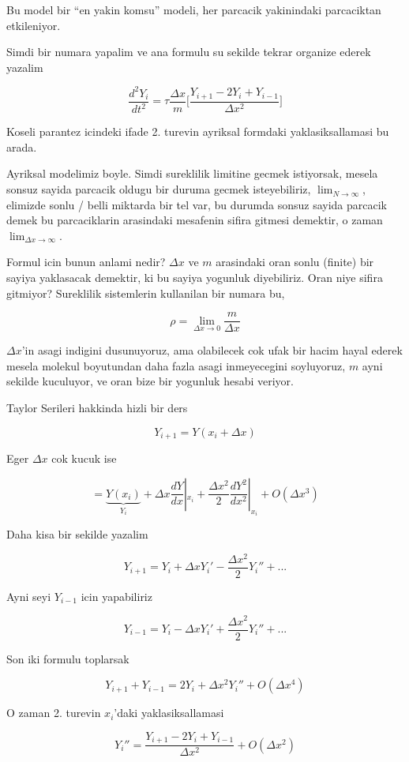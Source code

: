 \documentclass[12pt,fleqn]{article}
\begin{document}
Bu model bir ``en yakin komsu'' modeli, her parcacik yakinindaki
parcaciktan etkileniyor. 

Simdi bir numara yapalim ve ana formulu su sekilde tekrar organize ederek
yazalim

\[ \frac{d^2Y_i}{dt^2} = 
\tau \frac{\Delta x}{m} \bigg[
\frac{Y_{i+1} - 2Y_i + Y_{i-1}}{\Delta x^2}
\bigg]
\]

Koseli parantez icindeki ifade 2. turevin ayriksal formdaki
yaklasiksallamasi bu arada. 

Ayriksal modelimiz boyle. Simdi sureklilik limitine gecmek istiyorsak,
mesela sonsuz sayida parcacik oldugu bir duruma gecmek isteyebiliriz,
$\lim_{N \to \infty}$, elimizde sonlu / belli miktarda bir tel var, bu durumda 
sonsuz sayida parcacik demek bu parcaciklarin arasindaki mesafenin sifira 
gitmesi demektir, o zaman $\lim_{\Delta x \to \infty}$. 

Formul icin bunun anlami nedir? $\Delta x$ ve $m$ arasindaki oran sonlu
(finite) bir sayiya yaklasacak demektir, ki bu sayiya yogunluk
diyebiliriz. Oran niye sifira gitmiyor? Sureklilik sistemlerin kullanilan
bir numara bu,

\[ \rho = \lim_{\Delta x \to 0} \frac{m}{\Delta x} \]

$\Delta x$'in asagi indigini dusunuyoruz, ama olabilecek cok ufak bir hacim
hayal ederek mesela molekul boyutundan daha fazla asagi inmeyecegini
soyluyoruz, $m$ ayni sekilde kuculuyor, ve oran bize bir yogunluk hesabi
veriyor.

Taylor Serileri hakkinda hizli bir ders

\[ Y_{i+1}=Y(x_i + \Delta x) \]

Eger $\Delta x$ cok kucuk ise

\[ = 
\underbrace{Y(x_i)}_{Y_i} + \Delta x \frac{dY}{dx}|_{x_i} + 
\frac{\Delta x^2}{2}\frac{dY^2}{dx^2}|_{x_i} + 
O(\Delta x^3)
\]

Daha kisa bir sekilde yazalim

\[ Y_{i+1} = Y_i + \Delta x Y_i' - \frac{\Delta x^2}{2}Y_i'' + ... 
\]

Ayni seyi $Y_{i-1}$ icin yapabiliriz

\[ Y_{i-1} = Y_i - \Delta x Y_i' + \frac{\Delta x^2}{2}Y_i'' + ... 
\]

Son iki formulu toplarsak

\[ Y_{i+1} + Y_{i-1} = 2Y_i + \Delta x^2 Y_i''  + O(\Delta x^4)\]

O zaman 2. turevin $x_i$'daki yaklasiksallamasi 

\[ Y_i'' = \frac{Y_{i+1} - 2Y_i + Y_{i-1}}{\Delta x^2} + O(\Delta x^2) \]
\end{document}
